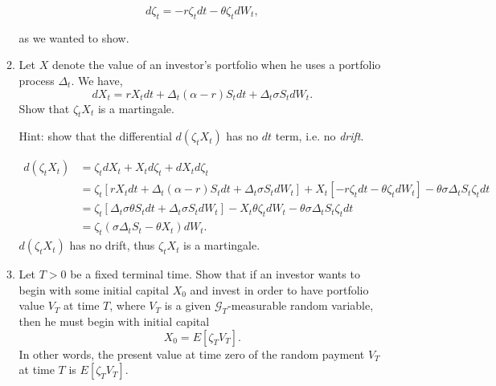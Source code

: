 \documentclass[handout,8pt]{beamer}
\begin{document}
\begin{frame}[allowframebreaks]{ }
\begin{enumerate}
\begin{enumerate}
        \begin{equation*}
            d\zeta_t = -r\zeta_t dt -\theta\zeta_t dW_t,
        \end{equation*}
        
        as we wanted to show. \newline
        
        \item Let $X$ denote the value of an investor's portfolio when he uses a portfolio process $\Delta_t$. We have,
        \begin{equation*}
            dX_t= rX_t dt + \Delta_t(\alpha -r) S_t dt + \Delta_t \sigma S_t dW_t.
        \end{equation*}
        Show that $\zeta_t X_t$ is a martingale.\newline 
        
        Hint: show that the differential $d(\zeta_t X_t)$ has no $dt$ term, i.e. no \textit{drift}. \newline
        
        \begin{align*}
            d(\zeta_t X_t) &= \zeta_t dX_t + X_t d\zeta_t + dX_td\zeta_t\\
            &= \zeta_t[rX_t dt + \Delta_t(\alpha -r)S_t dt + \Delta_t\sigma S_t dW_t] + X_t [-r\zeta_t dt - \theta\zeta_t dW_t] -\theta \sigma \Delta_t S_t \zeta_t dt\\
            &= \zeta_t[\Delta_t\sigma\theta S_t dt + \Delta_t\sigma S_t dW_t] - X_t\theta\zeta_t dW_t -\theta\sigma\Delta_t S_t\zeta_t dt\\
            &= \zeta_t(\sigma\Delta_t S_t - \theta X_t) dW_t.
        \end{align*}
        $d(\zeta_t X_t)$ has no drift, thus $\zeta_tX_t$ is a martingale.
        
        \item Let $T>0$ be a fixed terminal time. Show that if an investor wants to begin with some initial capital $X_0$ and invest in order to have portfolio value $V_T$ at time 			$T$, where $V_T$ is a given $\mathcal{G}_T$-measurable random variable, then he must begin with initial capital
        \begin{equation*}
            X_0 = E[\zeta_T V_T].
        \end{equation*}
        In other words, the present value at time zero of the random payment $V_T$ at time $T$ is $E[\zeta_T V_T]$. \newline
        

\end{enumerate}
\end{enumerate}
\end{frame}
\end{document}
